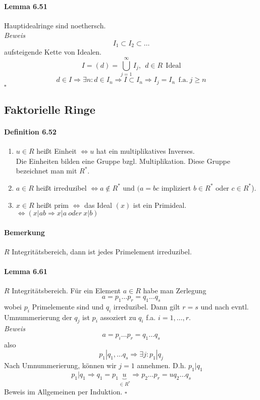 \documentclass{scrartcl}
\begin{document}
\paragraph{Lemma 6.51}
Hauptidealringe sind noethersch. \\
\textit{Beweis} \\
\[
  I_1 \subset I_2 \subset \dots
\]
aufsteigende Kette von Idealen.
\[
  I = (d) = \bigcup_{j = 1}^\infty I_j, ~~ d \in R ~~ \text{Ideal}
\]
\[
  d \in I \Rightarrow \exists n: d \in I_n \Rightarrow  I \subset I_n
  \Rightarrow I_j = I_n ~~ \text{f.a.} ~ j \geq n 
\]
\hfill $\square$

\subsection{Faktorielle Ringe}
\label{subsec:faktorielleringe}

\paragraph{Definition 6.52}
\begin{enumerate}
\item $u \in R$ heißt Einheit $\Leftrightarrow u$ hat ein multiplikatives Inverses.
  \\
  Die Einheiten bilden eine Gruppe bzgl. Multiplikation. Diese Gruppe bezeichnet
  man mit $R^*$.
\item $a \in R$ heißt irreduzibel $\Leftrightarrow a \notin R^*$ und $(a = bc$
  impliziert $b \in R^*$ oder $c \in R^*$).
\item $x \in R$ heißt prim $\Leftrightarrow$ das Ideal $(x)$ ist ein Primideal.
  $\Leftrightarrow (x|ab \Rightarrow x|a ~oder~ x|b)$
\end{enumerate}

\paragraph{Bemerkung}
$R$ Integritätsbereich, dann ist jedes Primelement irreduzibel.

\paragraph{Lemma 6.61}
$R$ Integritätsbereich. Für ein Element $a \in R$ habe man Zerlegung
\[
  a = p_1 \dots p_r = q_1 \dots q_s
\]
wobei $p_i$ Primelemente sind und $q_i$ irreduzibel. Dann gilt $r = s$ und nach
evntl. Umnummerierung der $q_j$ ist $p_i$ assoziert zu $q_i$
f.a. $i = 1, \dots, r$. \\
\textit{Beweis}
\[
  a = p_i \dots p_r = q_1 \dots q_s
\]
also
\[
  p_1|q_1, \dots q_s \Rightarrow \exists j: p_1|q_j
\]
Nach Umnummerierung, können wir $j = 1$ annehmen. D.h. $p_1|q_1$
\[
  p_1|q_1 \Rightarrow q_1 = p_1\underbrace{u}_{\in R^*}
  \Rightarrow p_2 \dots p_r = uq_2 \dots q_s
\]
Beweis im Allgemeinen per Induktion.
\hfill $\square$
\end{document}
